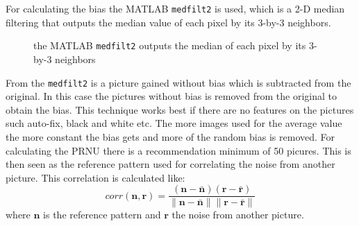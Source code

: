 For calculating the bias the MATLAB \texttt{medfilt2} is used, which is a 2-D median filtering that outputs the median value of each pixel by its 3-by-3 neighbors. 
\begin{figure}[H]
  \centering
  
  \caption{\label{fig:medfilt2} the MATLAB \texttt{medfilt2} outputs the median of each pixel by its 3-by-3 neighbors}
\end{figure}
From the \texttt{medfilt2} is a picture gained without bias which is subtracted from the original. In this case the pictures without bias is removed from the original to obtain the bias. This technique works best if there are no features on the pictures such auto-fix, black and white etc. The more images used for the average value the more constant the bias gets and more of the random bias is removed. For calculating the PRNU there is a recommendation minimum of 50 picures. This is then seen as the reference pattern used for correlating the noise from another picture. This correlation is calculated like:
$$
corr(\boldsymbol{n},\boldsymbol{r}) = 
\frac{(\boldsymbol{n} - \bar{\boldsymbol{n}})(\boldsymbol{r} - \bar{\boldsymbol{r}})}
{\|\boldsymbol{n} - \bar{\boldsymbol{n}}\| \|\boldsymbol{r} - \bar{\boldsymbol{r}}\|}
$$
where $\boldsymbol{n}$ is the reference pattern and $\boldsymbol{r}$ the noise from another picture. 
\cite[]{sensor:camera:DCIdent}

